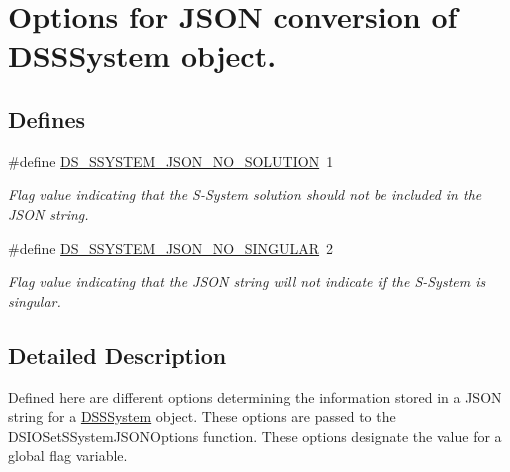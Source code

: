 \hypertarget{group___d_s___s_s_y_s_t_e_m___j_s_o_n___o_p_t_i_o_n_s}{
\section{Options for JSON conversion of DSSSystem object.}
\label{group___d_s___s_s_y_s_t_e_m___j_s_o_n___o_p_t_i_o_n_s}
}
\subsection*{Defines}
\begin{DoxyCompactItemize}
\item 
\hypertarget{group___d_s___s_s_y_s_t_e_m___j_s_o_n___o_p_t_i_o_n_s_gade5134b08dd7f1da683bdb3fb876cc11}{
\#define \hyperlink{group___d_s___s_s_y_s_t_e_m___j_s_o_n___o_p_t_i_o_n_s_gade5134b08dd7f1da683bdb3fb876cc11}{DS\_\-SSYSTEM\_\-JSON\_\-NO\_\-SOLUTION}~1}
\label{group___d_s___s_s_y_s_t_e_m___j_s_o_n___o_p_t_i_o_n_s_gade5134b08dd7f1da683bdb3fb876cc11}

\begin{DoxyCompactList}\small\item\em Flag value indicating that the S-\/System solution should not be included in the JSON string. \item\end{DoxyCompactList}\item 
\hypertarget{group___d_s___s_s_y_s_t_e_m___j_s_o_n___o_p_t_i_o_n_s_ga81352fdd00a529e9a2bc2be107fd7a9b}{
\#define \hyperlink{group___d_s___s_s_y_s_t_e_m___j_s_o_n___o_p_t_i_o_n_s_ga81352fdd00a529e9a2bc2be107fd7a9b}{DS\_\-SSYSTEM\_\-JSON\_\-NO\_\-SINGULAR}~2}
\label{group___d_s___s_s_y_s_t_e_m___j_s_o_n___o_p_t_i_o_n_s_ga81352fdd00a529e9a2bc2be107fd7a9b}

\begin{DoxyCompactList}\small\item\em Flag value indicating that the JSON string will not indicate if the S-\/System is singular. \item\end{DoxyCompactList}\end{DoxyCompactItemize}


\subsection{Detailed Description}
Defined here are different options determining the information stored in a JSON string for a \hyperlink{struct_d_s_s_system}{DSSSystem} object. These options are passed to the DSIOSetSSystemJSONOptions function. These options designate the value for a global flag variable. 